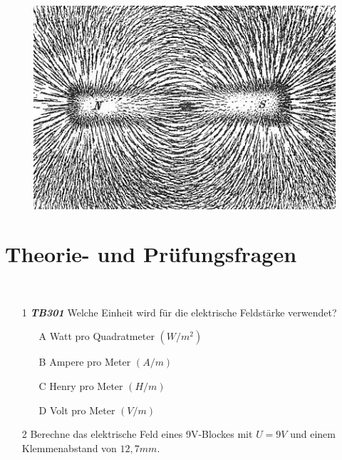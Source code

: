 \begin{figure}
 \vspace{-7cm}
  \includegraphics[scale=0.35]{Felder/Bilder/Magnet.jpg}
 \vspace{-7cm}
\end{figure}

\section*{Theorie- und Prüfungsfragen}

~~~~~~


\begin{enumerate} 
\itemsep1pt\parskip0pt
\item[1] \emph{\textbf{TB301}} Welche Einheit wird für die elektrische Feldstärke verwendet?
	\begin{enumerate}
	\itemsep1pt\parskip0pt
		\item[A] Watt pro Quadratmeter $(W/m^2)$
		\item[B] Ampere pro Meter $(A/m)$
		\item[C] Henry pro Meter $(H/m)$
		\item[D] Volt pro Meter $(V/m)$
	\end{enumerate}
\end{enumerate}

\begin{enumerate} 
\itemsep1pt\parskip0pt
\item[2] Berechne das elektrische Feld eines 9V-Blockes mit $U = 9V$ und einem Klemmenabstand von $12,7mm$.
\end{enumerate}

